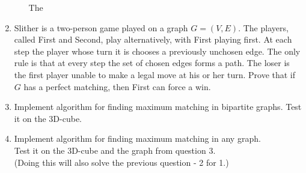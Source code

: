\documentclass[11pt, oneside]{article}
\begin{document}
\begin{enumerate}
\begin{enumerate}
        The 
    \end{enumerate}

  \item %
    Slither is a two-person game played on a graph $G=(V,E)$. 
    The players, called First and Second, play alternatively, with First playing first.
    At each step the player whose turn it is chooses a previously unchosen edge.
    The only rule is that at every step the set of chosen edges forms a path.
    The loser is the first player unable to make a legal move at his or her turn.
    Prove that if $G$ has a perfect matching, then First can force a win.

  \item %
    Implement algorithm for finding maximum matching in bipartite graphs.
    Test it on the 3D-cube.

  \item %
    Implement algorithm for finding maximum matching in any graph.\\
    Test it on the 3D-cube and the graph from question 3.\\
    (Doing this will also solve the previous question - 2 for 1.)
\end{enumerate}
\end{document}
